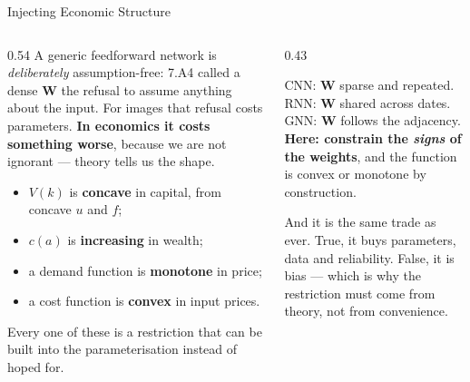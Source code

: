 \begin{frame}{Injecting Economic Structure}
\begin{columns}[T]
\begin{column}{0.54\textwidth}
\small
A generic feedforward network is \emph{deliberately} assumption-free: 7.A4 called a dense $\mathbf{W}$ the refusal to assume anything about the input. For images that refusal costs parameters. \textbf{In economics it costs something worse}, because we are not ignorant --- theory tells us the shape.
\medskip

\begin{itemize}\small\setlength{\itemsep}{1mm}
  \item $V(k)$ is \textbf{concave} in capital, from concave $u$ and $f$;
  \item $c(a)$ is \textbf{increasing} in wealth;
  \item a demand function is \textbf{monotone} in price;
  \item a cost function is \textbf{convex} in input prices.
\end{itemize}
\medskip

Every one of these is a restriction that can be built into the parameterisation instead of hoped for.
\end{column}
\begin{column}{0.43\textwidth}
\begin{takeawaybox}[title=\textbf{7.A4's fourth class}]\small
CNN: $\mathbf{W}$ sparse and repeated. RNN: $\mathbf{W}$ shared across dates. GNN: $\mathbf{W}$ follows the adjacency.
\medskip
\textbf{Here: constrain the \emph{signs} of the weights}, and the function is convex or monotone by construction.
\end{takeawaybox}
\medskip
\begin{examplebox}\footnotesize
And it is the same trade as ever. True, it buys parameters, data and reliability. False, it is bias --- which is why the restriction must come from theory, not from convenience.
\end{examplebox}
\end{column}
\end{columns}
\end{frame}

